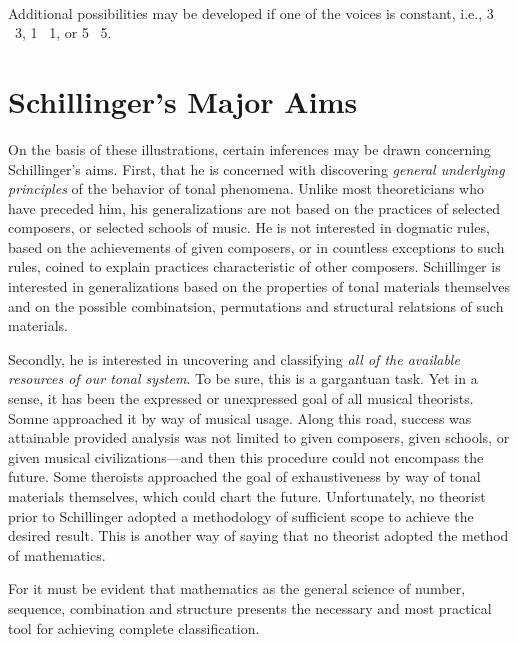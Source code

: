 \vspace{10mm}
\hspace{51mm}
\vspace{2mm} \\

Additional possibilities may be developed if one of the voices is constant, i.e., 3 \rightarrow\ 3, 1 \rightarrow\ 1, or 5 \rightarrow\ 5.

\section{Schillinger's Major Aims}

On the basis of these illustrations, certain inferences may be drawn concerning Schillinger's aims. First, that he is concerned with discovering \textit{general underlying principles} of the behavior of tonal phenomena. Unlike most theoreticians who have preceded him, his generalizations are not based on the practices of selected composers, or selected schools of music. He is not interested in dogmatic rules, based on the achievements of given composers, or in countless exceptions to such rules, coined to explain practices characteristic of other composers. Schillinger is interested in generalizations based on the properties of tonal materials themselves and on the possible combinatsion, permutations and structural relatsions of such materials.

Secondly, he is interested in uncovering and classifying \textit{all of the available resources of our tonal system}. To be sure, this is a gargantuan task. Yet in a sense, it has been the expressed or unexpressed goal of all musical theorists. Somne approached it by way of musical usage. Along this road, success was attainable provided analysis was not limited to given composers, given schools, or given musical civilizations---and then this procedure could not encompass the future. Some theroists approached the goal of exhaustiveness by way of tonal materials themselves, which could chart the future. Unfortunately, no theorist prior to Schillinger adopted a methodology of sufficient scope to achieve the desired result. This is another way of saying that no theorist adopted the method of mathematics.

For it must be evident that mathematics as the general science of number, sequence, combination and structure presents the necessary and most practical tool for achieving complete classification.

